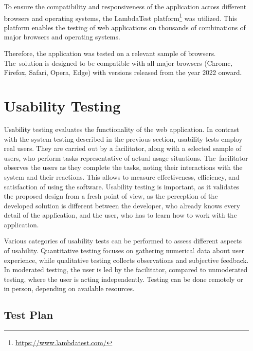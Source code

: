 To ensure the compatibility and responsiveness of the application across different browsers and operating systems, the LambdaTest platform\footnote{\url{https://www.lambdatest.com/}} was utilized. This platform enables the testing of web applications on thousands of combinations of major browsers and operating systems.~\cite{LambdaTest}

Therefore, the application was tested on a relevant sample of browsers. The~solution is designed to be compatible with all major browsers (Chrome, Firefox, Safari, Opera, Edge) with versions released from the year 2022 onward.


\section{Usability Testing}

Usability testing evaluates the functionality of the web application. In contrast with the system testing described in the previous section, usability tests employ real users. They are carried out by a facilitator, along with a selected sample of users, who perform tasks representative of actual usage situations. The~facilitator observes the users as they complete the tasks, noting their interactions with the system and their reactions. This allows to measure effectiveness, efficiency, and satisfaction of using the software. Usability testing is important, as it validates the proposed design from a fresh point of view, as the perception of the developed solution is different between the developer, who already knows every detail of the application, and the user, who has to learn how to work with the application.~\cite{Barnum2021}

Various categories of usability tests can be performed to assess different aspects of usability. Quantitative testing focuses on gathering numerical data about user experience, while qualitative testing collects observations and subjective feedback. In moderated testing, the user is led by the facilitator, compared to unmoderated testing, where the user is acting independently. Testing can be done remotely or in person, depending on available resources.~\cite{Moran2019}


\subsection{Test Plan}

